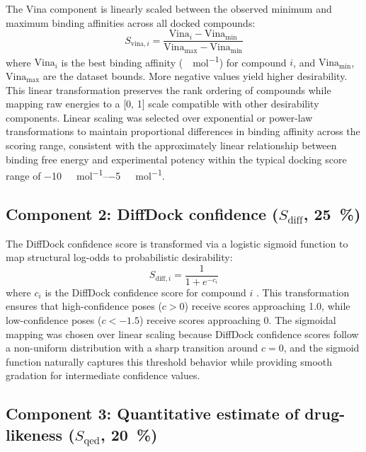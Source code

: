 \documentclass[journal=jcisd8,manuscript=suppinfo]{achemso}
\begin{document}
The Vina component is linearly scaled between the observed minimum and maximum binding affinities across all docked compounds:
\begin{equation}
S_{\text{vina}, i} = \frac{\text{Vina}_i - \text{Vina}_{\min}}{\text{Vina}_{\max} - \text{Vina}_{\min}}
\label{eq:vina}
\end{equation}
where $\text{Vina}_i$ is the best binding affinity (\unit{\kilo\calorie\per\mole}) for compound $i$, and $\text{Vina}_{\min}$, $\text{Vina}_{\max}$ are the dataset bounds. More negative values yield higher desirability. This linear transformation preserves the rank ordering of compounds while mapping raw energies to a [\num{0}, \num{1}] scale compatible with other desirability components. Linear scaling was selected over exponential or power-law transformations to maintain proportional differences in binding affinity across the scoring range, consistent with the approximately linear relationship between binding free energy and experimental potency within the typical docking score range of \qtyrange{-10}{-5}{\kilo\calorie\per\mole}.

\subsection*{Component 2: DiffDock confidence ($S_{\text{diff}}$, \qty{25}{\percent})}

The DiffDock confidence score is transformed via a logistic sigmoid function to map structural log-odds to probabilistic desirability:
\begin{equation}
S_{\text{diff}, i} = \frac{1}{1 + e^{-c_i}}
\label{eq:diffdock}
\end{equation}
where $c_i$ is the DiffDock confidence score for compound $i$ \cite{Corso2023}. This transformation ensures that high-confidence poses ($c > \num{0}$) receive scores approaching \num{1.0}, while low-confidence poses ($c < \num{-1.5}$) receive scores approaching \num{0}. The sigmoidal mapping was chosen over linear scaling because DiffDock confidence scores follow a non-uniform distribution with a sharp transition around $c = \num{0}$, and the sigmoid function naturally captures this threshold behavior while providing smooth gradation for intermediate confidence values.

\subsection*{Component 3: Quantitative estimate of drug-likeness ($S_{\text{qed}}$, \qty{20}{\percent})}
\end{document}
